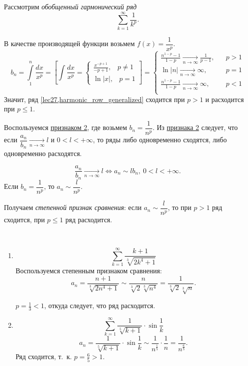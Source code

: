 \documentclass[../../main.tex]{subfiles}
\begin{document}
	\begin{iex} Рассмотрим \emph{обобщенный гармонический ряд}
		\begin{equation}  \sum_{k = 1}^{\infty} \frac{1}{k^p}. 
		\label{lec27,harmonic_row_generalized}  \end{equation}
		
		В качестве производящей функции возьмем $f(x) = \dfrac{1}{x^p}$.
		\[ b_n = \int\limits_{1}^{n} \frac{dx}{x^p} =\left[ \int\dfrac{dx}{x^p} = 
		\begin{cases} \frac{x^{-p + 1}}{-p + 
		1} , \; \;\; p \ne 1  \\  \ln{|x|}, \; \; \; p = 1 \end{cases} \right] =  
		\begin{cases} \frac{n^{1-p} - 1}{1-p } \underset{n \rightarrow \infty}
		{\longrightarrow} \frac{1}{p-1} ,& \; \;\; p > 1  \\  \ln{|n|} \underset{n 
		\rightarrow \infty}
		{\longrightarrow} \infty ,& \; \; \; p = 1 \\
		\frac{n^{1-p} - 1}{1-p } \underset{n \rightarrow \infty}
		{\longrightarrow} \infty ,& \; \;\; p < 1  \\
		\end{cases} \]
		Значит, ряд \eqref{lec27,harmonic_row_generalized} 
		сходится при $p>1$ и расходится при $p \le 1$.
		\end{iex}
		
		Воспользуемся \hyperref[lec26:comp_test_2]{признаком 2\textdegree}, где 
		возьмем $b_n = \dfrac{1}{n^p}$. Из 
		\hyperref[lec26:comp_test_2]{признака 2\textdegree} следует, что если 
		$\dfrac{a_n}{b_n} \underset{n 
		\rightarrow \infty} {\longrightarrow} l $ и $0 < l < +\infty$, то ряды 
		либо одновременно сходятся, либо одновременно расходятся.
		
		\[\dfrac{a_n}{b_n} \underset{n \rightarrow \infty} {\longrightarrow} l \iff 
		a_n 
		\sim l b_n,\ 0 < l < +\infty.\] Если $b_n = \dfrac{1}{n^p}$, то $a_n \sim 
		\dfrac{l}{n^p}$.
		
		Получаем \emph{степенной признак сравнения}:
		если $a_n \sim \dfrac{l}{n^p}$, то при $p>1$ ряд сходится, при $p \le 1$ ряд 
		расходится.

	\begin{examples}
		~
	\begin{enumerate}[label=\arabic*)]	
		\item \[ \sum_{k = 1}^{\infty} \frac{k+1}{\sqrt[3]{2k^4 + 1}}  \]
		Воспользуемся степенным признаком сравнения:
		\[ a_n = \frac{n+1}{\sqrt[3]{2n^4 + 1}} \sim \frac{n}{\sqrt[3]{2} 
		\sqrt[3]{n^4}} = \frac{1}{\sqrt[3]{2} \sqrt[3]{n}}. \]
		
		$p = \frac{1}{3} < 1$, откуда следует, что ряд расходится. 
		\item \[ \sum_{k=1}^{\infty} \frac{1}{\sqrt[5]{k+1}}\cdot \sin{\frac{1}{k}}  
		\]
		\[  a_n =  \frac{1}{\sqrt[5]{k+1}}\cdot \sin{\frac{1}{k}} \sim 
		\frac{1}{n^{\frac{1}{5}} } \cdot \frac{1}{n} =  \frac{1}{n^{\frac{6}{5}} }.  
		\]
		Ряд сходится, т.~к. $p = \frac{6}{5} > 1$.
	\end{enumerate}	
	\end{examples}	
\end{document}
